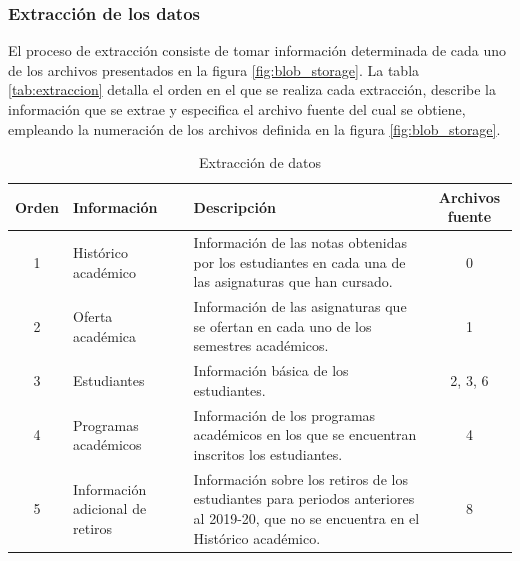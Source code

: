 \subsubsection{Extracción de los datos}

El proceso de extracción consiste de tomar información determinada de cada uno de los archivos presentados en la figura \ref{fig:blob_storage}. La tabla \ref{tab:extraccion} detalla el orden en el que se realiza cada extracción, describe la información que se extrae y especifica el archivo fuente del cual se obtiene, empleando la numeración de los archivos definida en la figura \ref{fig:blob_storage}.

\begin{table}[h]
	\centering
	\caption{Extracción de datos}
	\alternatecolors
	\begin{tabular}{cp{2.3cm}p{7cm}c}
		\hline
		\textbf{Orden} & \textbf{Información}                               & \textbf{Descripción}                                                                                                                 & \textbf{Archivos fuente} \\
		\hline
		1              & Histórico académico                                & Información de las notas obtenidas por los estudiantes en cada una de las asignaturas que han cursado.                               & 0                        \\
		2              & Oferta \newline académica                          & Información de las asignaturas que se ofertan en cada uno de los semestres académicos.                                               & 1                        \\
		3              & Estudiantes                                        & Información básica de los estudiantes.                                                                                               & 2, 3, 6                  \\
		4              & Programas académicos                               & Información de los programas académicos en los que se encuentran inscritos los estudiantes.                                          & 4                        \\
		5              & Información \newline adicional \newline de retiros & Información sobre los retiros de los estudiantes para periodos anteriores al 2019-20, que no se encuentra en el Histórico académico. & 8                        \\

\end{tabular}
\end{table}
